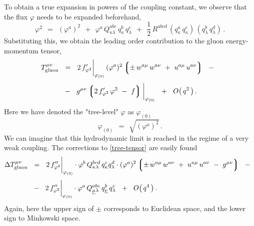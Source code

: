 \documentclass[epsfig,12pt]{article}
\def\beq{\begin{equation}}
\def\eeq{\end{equation}}
\newcommand{\lgr}{\left\lgroup}
\newcommand{\rgr}{\right\rgroup}
\begin{document}
	To obtain a true expansion in powers of the coupling constant, we observe that the flux $ \varphi $
	needs to be expanded beforehand,
\beq
	\varphi^2    ~~=~~    (\varphi^a)^2  ~~+~~ \varphi^a\, Q^{abc}_{\kappa\lambda}\, q^b_\kappa\, q^c_\lambda
		     ~~+~~ \frac 1 2\, R^{abcd}\, (q^a_\kappa\, q^c_\kappa)\, (q^b_\lambda\, q^d_\lambda)\,.
\eeq
	Substituting this, we obtain the leading order contribution to the gluon energy-momentum tensor,
\begin{align}
%
\notag
	T_\text{gluon}^{\mu\nu}    & ~~=~~    2\, f^\prime_{\varphi^2} \bigg|_{\varphi_{(0)}}\,
					      (\varphi^a)^2 \lgr \pm\, w^{a\mu}\, w^{a\nu}  ~+~  u^{a\mu}\, u^{a\nu} \rgr
				     ~~-~~
	\\[1mm]
%
\label{tree-tensor}
				   & ~~-~~    g^{\mu\nu} \lgr 2\, f^\prime_{\varphi^2}\, \varphi^2 ~-~ f \rgr \bigg|_{\varphi_{(0)}}
				     ~~+~~    O\big(\, q^2 \,\big)\,.
\end{align}
	Here we have denoted the "tree-level" $ \varphi $ as $ \varphi_{(0)} $\,
\beq
	\varphi_{(0)}    ~~=~~    \sqrt{ (\varphi^a)^2 }\,.
\eeq
	We can imagine that this hydrodynamic limit is reached in the regime of a very weak coupling.
	The corrections to \eqref{tree-tensor} are easily found
\begin{align}
%
\notag
	\Delta T_\text{gluon}^{\mu\nu}    & ~~=~~    2\, f''_{\varphi^2}\bigg|_{\varphi_{(0)}} \cdot
						     \varphi^b\, Q^{bcd}_{\kappa\lambda}\, q^c_\kappa q^d_\lambda \cdot
						     (\varphi^a)^2
						     \lgr \pm\, w^{a\mu}\, w^{a\nu} ~+~ u^{a\mu}\, u^{a\nu} ~-~ g^{\mu\nu} \rgr
					    ~~-~~
	\\[1mm]
%
\label{tensor-corr}
					  & ~~-~~    2\, f''_{\varphi^2}\bigg|_{\varphi_{(0)}} \cdot
						     \varphi^a\, Q^{abc}_{\underline{\mu}\lambda}\, q^b_{\underline \nu}\, q^c_\lambda
					    ~~+~~ O\big(\, q^4 \,\big)\,.
\end{align}
	Again, here the upper sign of $ \pm $ corresponds to Euclidean space, and the lower sign to Minkowski space.




\end{document}
